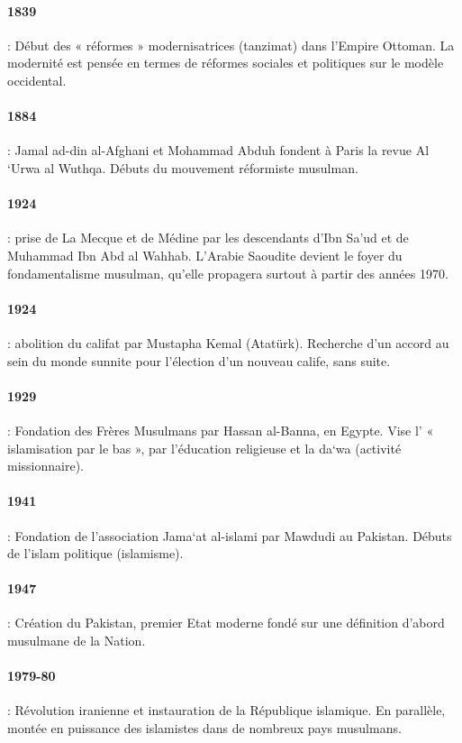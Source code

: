 \paragraph{1839 } : Début des « réformes » modernisatrices (tanzimat) dans l’Empire Ottoman. La modernité est pensée en termes de réformes sociales et politiques sur le modèle occidental.
\paragraph{1884 } : Jamal ad-din al-Afghani et Mohammad Abduh fondent à Paris la revue Al ‘Urwa al Wuthqa. Débuts du mouvement réformiste musulman.
\paragraph{1924 } : prise de La Mecque et de Médine par les descendants d’Ibn Sa’ud et de Muhammad Ibn Abd al Wahhab. L’Arabie Saoudite devient le foyer du fondamentalisme musulman, qu’elle propagera surtout à partir des années 1970.
\paragraph{1924 } : abolition du califat par Mustapha Kemal (Atatürk). Recherche d’un accord au sein du monde sunnite pour l’élection d’un nouveau calife, sans suite.
\paragraph{1929 } : Fondation des Frères Musulmans par Hassan al-Banna, en Egypte. Vise l’ « islamisation par le bas », par l’éducation religieuse et la da‘wa (activité missionnaire).
\paragraph{1941 } : Fondation de l’association Jama‘at al-islami par Mawdudi au Pakistan. Débuts de l’islam politique (islamisme).
\paragraph{1947 } : Création du Pakistan, premier Etat moderne fondé sur une définition d’abord musulmane de la Nation.
\paragraph{1979-80 } : Révolution iranienne et instauration de la République islamique. En parallèle, montée en puissance des islamistes dans de nombreux pays musulmans.
